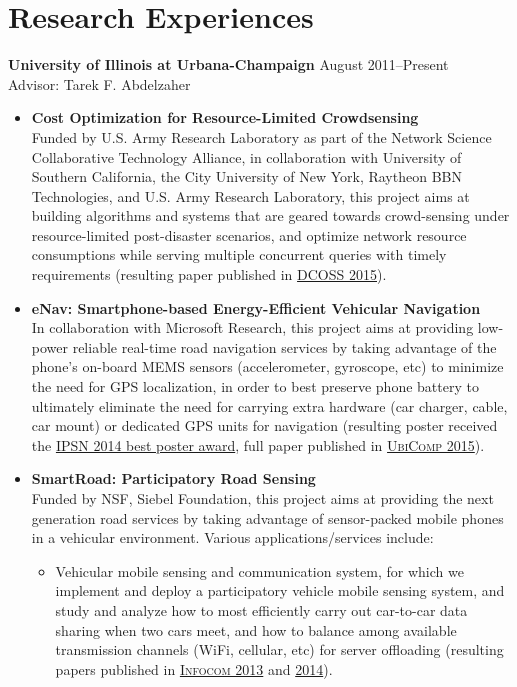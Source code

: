 \section{\sc Research Experiences} {\bf University of Illinois at Urbana-Champaign} \hfill August 2011--Present\\
Advisor: Tarek F. Abdelzaher
\begin{itemize}
\item \textbf{Cost Optimization for Resource-Limited Crowdsensing}\\ Funded by U.S. Army Research Laboratory as part of the Network Science Collaborative Technology Alliance, in collaboration with University of Southern California, the City University of New York, Raytheon BBN Technologies, and U.S. Army Research Laboratory, this project aims at building algorithms and systems that are geared towards crowd-sensing under resource-limited post-disaster scenarios, and optimize network resource consumptions while serving multiple concurrent queries with timely requirements (resulting paper published in \hyperlink{hu2015dcoss}{\textsc{DCOSS 2015}}).

\item \textbf{eNav: Smartphone-based Energy-Efficient Vehicular Navigation}\\ In collaboration with Microsoft Research, this project aims at providing low-power reliable real-time road navigation services by taking advantage of the phone's on-board MEMS sensors (accelerometer, gyroscope, etc) to minimize the need for GPS localization, in order to best preserve phone battery to ultimately eliminate the need for carrying extra hardware (car charger, cable, car mount) or dedicated GPS units for navigation (resulting poster received the \hyperlink{hu2014ipsn}{IPSN 2014 best poster award}, full paper published in \hyperlink{hu2015ubicomp}{\textsc{UbiComp 2015}}).

\item \textbf{SmartRoad: Participatory Road Sensing} \\
Funded by NSF, Siebel Foundation, this project aims at providing the next generation road services by taking advantage of sensor-packed mobile phones in a vehicular environment. Various applications/services include:
\begin{itemize}
\item Vehicular mobile sensing and communication system, for which we implement and deploy a participatory vehicle mobile sensing system, and study and analyze how to most efficiently carry out car-to-car data sharing when two cars meet, and how to balance among available transmission channels (WiFi, cellular, etc) for server offloading (resulting papers published in \hyperlink{liu2013infocom}{\textsc{Infocom 2013}} and \hyperlink{hu2014infocom}{\textsc{2014}}).


\end{itemize}
\end{itemize}
